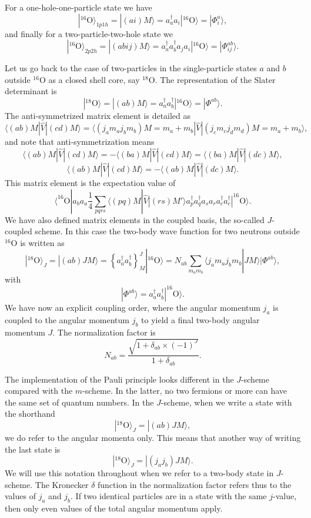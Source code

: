 {For a one-hole-one-particle state we have
\[
|^{16}\mathrm{O}\rangle_{1p1h} =|(ai)M\rangle  = a_a^{\dagger}a_i|^{16}\mathrm{O}\rangle=|\Phi_{i}^a\rangle,
\]
and finally for a two-particle-two-hole state we 
\[
|^{16}\mathrm{O}\rangle_{2p2h} =|(abij)M\rangle  = a_a^{\dagger}a_b^{\dagger}a_ja_i|^{16}\mathrm{O}\rangle=|\Phi_{ij}^{ab}\rangle.
\]

Let us go back to the case of two-particles in the single-particle states $a$ and $b$ outside $^{16}$O as a closed shell core, say $^{18}$O.
The representation of the Slater determinant is 
\[
|^{18}\mathrm{O}\rangle =|(ab)M\rangle  = a^{\dagger}_aa^{\dagger}_b|^{16}\mathrm{O}\rangle=|\Phi^{ab}\rangle.
\]
The anti-symmetrized matrix element is detailed as 
\[
\langle (ab) M | \hat{V} | (cd) M \rangle = \langle (j_am_aj_bm_b)M=m_a+m_b |  \hat{V} | (j_cm_cj_dm_d)M=m_a+m_b \rangle,
\]
and note that anti-symmetrization means 
\[
\langle (ab) M | \hat{V} | (cd) M \rangle =-\langle (ba) M | \hat{V} | (cd) M \rangle =\langle (ba) M | \hat{V} | (dc) M \rangle,
\]
\[
\langle (ab) M | \hat{V} | (cd) M \rangle =-\langle (ab) M | \hat{V} | (dc) M \rangle. 
\]
This matrix element is the expectation value of 
\[
\langle ^{16}\mathrm{O}|a_ba_a\frac{1}{4}\sum_{pqrs}\langle (pq) M | \hat{V} | (rs) M' \rangle a^{\dagger}_pa^{\dagger}_qa_sa_r a^{\dagger}_ca^{\dagger}_c|^{16}\mathrm{O}\rangle.
\]
We have also defined matrix elements in the coupled basis, the so-called $J$-coupled scheme.
In this case the two-body wave function for two neutrons outside $^{16}$O is written as 
\[
|^{18}\mathrm{O}\rangle_J =|(ab)JM\rangle  = \left\{a^{\dagger}_aa^{\dagger}_b\right\}^J_M|^{16}\mathrm{O}\rangle=N_{ab}\sum_{m_am_b}\langle j_am_aj_bm_b|JM\rangle|\Phi^{ab}\rangle, 
\]
with 
\[
|\Phi^{ab}\rangle=a^{\dagger}_aa^{\dagger}_b|^{16}\mathrm{O}\rangle.
\]
We have now an explicit coupling order, where the angular momentum $j_a$ is coupled to the angular momentum $j_b$ to yield a final two-body angular momentum $J$. 
The normalization factor is
\[
N_{ab}=\frac{\sqrt{1+\delta_{ab}\times (-1)^J}}{1+\delta_{ab}}.
\]

The implementation of the Pauli principle looks different in the $J$-scheme compared with the $m$-scheme. In the latter, no two fermions or more can have the same set of quantum numbers. In the $J$-scheme, when we write a state with the shorthand 
\[
|^{18}\mathrm{O}\rangle_J =|(ab)JM\rangle,
\]
we do refer to the angular momenta only. This means that another way of writing the last state is
\[
|^{18}\mathrm{O}\rangle_J =|(j_aj_b)JM\rangle.
\]
We will use this notation throughout when we refer to a two-body state in $J$-scheme. The Kronecker $\delta$ function in the normalization factor 
refers thus to the values of $j_a$ and $j_b$. If two identical particles are in a state with the same $j$-value, then only even values of the total angular momentum apply.

}
